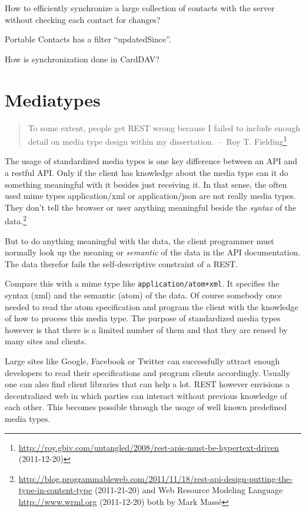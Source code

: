 \documentclass[12pt,a4paper]{scrartcl}		%
\newcommand{\citeurl}[2]{\url{#1} (#2)}
\begin{document}
How to efficiently synchronize a large collection of contacts with the server without checking each contact for changes?

Portable Contacts has a filter ``updatedSince''.

How is synchronization done in CardDAV?

\section{Mediatypes}

\begin{quote}
  To some extent, people get REST wrong because I failed to include enough
  detail on media type design within my dissertation.~--~Roy T. Fielding\footnote
  {\citeurl{http://roy.gbiv.com/untangled/2008/rest-apis-must-be-hypertext-driven}{2011-12-20}}
\end{quote}

The usage of standardized media types is one key difference between an API and a
restful API. \cite[sec. 5.2.1.2]{Fielding2000} Only if the client has knowledge
about the media type can it do something meaningful with it besides just
receiving it. In that sense, the often used mime types application/xml or
application/json are not really media types. They don't tell the browser or user
anything meaningful beside the \emph{syntax} of the data.\footnote{
\citeurl{http://blog.programmableweb.com/2011/11/18/rest-api-design-putting-the-type-in-content-type}{2011-21-20}
and Web Resource Modeling Language \citeurl{http://www.wrml.org}{2011-12-20} both by Mark Massé
}

But to do anything meaningful with the data, the client programmer must normally
look up the meaning or \emph{semantic} of the data in the API documentation. The
data therefor fails the self-descriptive constraint of a REST.

Compare this with a mime type like \texttt{application/atom+xml}. It specifies
the syntax (xml) and the semantic (atom) of the data. Of course somebody once
needed to read the atom specification and program the client with the knowledge
of how to process this media type. The purpose of standardized media types
however is that there is a limited number of them and that they are reused by many
sites and clients.

Large sites like Google, Facebook or Twitter can successfully attract enough
developers to read their specifications and program clients accordingly. Usually
one can also find client libraries that can help a lot. REST however envisions a
decentralized web in which parties can interact without previous knowledge of
each other. This becomes possible through the usage of well known predefined
media types.
\end{document}
